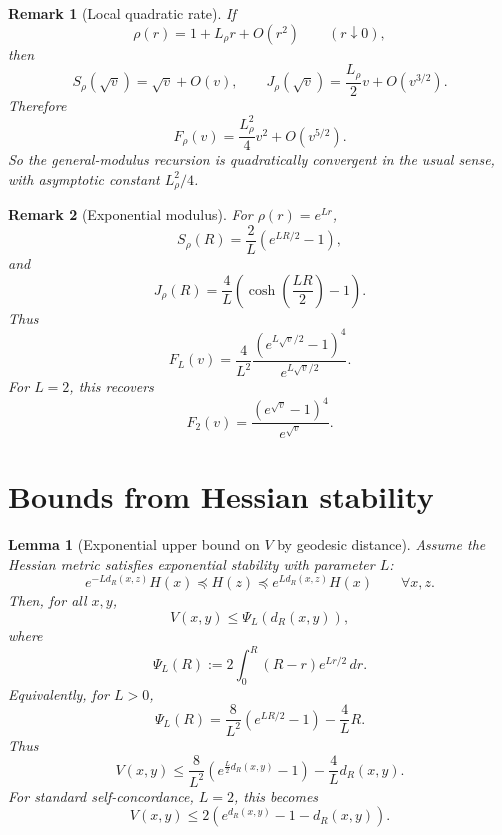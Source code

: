 \documentclass[11pt]{article}
\newtheorem{lemma}{Lemma}
\newtheorem{remark}{Remark}
\begin{document}
\begin{remark}[Local quadratic rate]
If
\[
    \rho(r)=1+L_\rho r+O(r^2)
    \qquad(r\downarrow0),
\]
then
\[
    S_\rho(\sqrt v)=\sqrt v+O(v),
    \qquad
    J_\rho(\sqrt v)=\frac{L_\rho}{2}v+O(v^{3/2}).
\]
Therefore
\[
    F_\rho(v)=\frac{L_\rho^2}{4}v^2+O(v^{5/2}).
\]
So the general-modulus recursion is quadratically convergent in the usual sense, with asymptotic constant $L_\rho^2/4$.
\end{remark}

\begin{remark}[Exponential modulus]
For $\rho(r)=e^{Lr}$,
\[
    S_\rho(R)=\frac{2}{L}\left(e^{LR/2}-1\right),
\]
and
\[
    J_\rho(R)=\frac{4}{L}\left(\cosh\left(\frac{LR}{2}\right)-1\right).
\]
Thus
\[
    F_L(v)
    =
    \frac{4}{L^2}
    \frac{\left(e^{L\sqrt v/2}-1\right)^4}{e^{L\sqrt v/2}}.
\]
For $L=2$, this recovers
\[
    F_2(v)=\frac{(e^{\sqrt v}-1)^4}{e^{\sqrt v}}.
\]
\end{remark}



\section{Bounds from Hessian stability}

\begin{lemma}[Exponential upper bound on \(V\) by geodesic distance]
Assume the Hessian metric satisfies exponential stability with parameter \(L\):
\[
    e^{-L d_R(x,z)}H(x)
    \preceq
    H(z)
    \preceq
    e^{L d_R(x,z)}H(x)
    \qquad
    \forall x,z.
\]
Then, for all \(x,y\),
\[
    V(x,y)
    \le
    \Psi_L(d_R(x,y)),
\]
where
\[
    \Psi_L(R)
    :=
    2\int_0^R (R-r)e^{Lr/2}\,dr.
\]
Equivalently, for \(L>0\),
\[
    \Psi_L(R)
    =
    \frac{8}{L^2}\left(e^{LR/2}-1\right)
    -
    \frac{4}{L}R.
\]
Thus
\[
    \boxed{
    V(x,y)
    \le
    \frac{8}{L^2}\left(e^{\frac{L}{2}d_R(x,y)}-1\right)
    -
    \frac{4}{L}d_R(x,y).
    }
\]
For standard self-concordance, \(L=2\), this becomes
\[
    \boxed{
    V(x,y)
    \le
    2\left(e^{d_R(x,y)}-1-d_R(x,y)\right).
    }
\]
\end{lemma}
\end{document}
